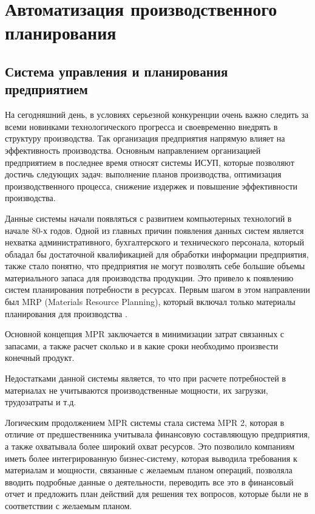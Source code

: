 \chapter{Автоматизация производственного планирования}
\section{Система управления и планирования предприятием}
На сегодняшний день, в условиях серьезной конкуренции очень важно следить за всеми новинками технологического прогресса и своевременно внедрять в структуру производства.
Так организация предприятия напрямую влияет на эффективность производства. Основным направлением организацией предприятием в последнее время относят системы ИСУП, которые позволяют достичь следующих задач: выполнение планов производства, оптимизация производственного процесса, снижение издержек и повышение эффективности производства.

Данные системы начали появляться с развитием компьютерных технологий в начале 80-х годов. Одной из главных причин появления данных систем является нехватка административного, бухгалтерского и технического персонала, который обладал бы достаточной квалификацией для обработки информации предприятия, также стало понятно, что предприятия не могут позволять себе большие объемы материального запаса для производства продукции. Это привело к появлению систем планирования потребности в ресурсах. Первым шагом в этом направлении был MRP (Materials Resource Planning), который включал только материалы планирования для производства \cite{MRP}.

Основной концепция MPR заключается в минимизации затрат связанных с запасами, а также расчет сколько и в какие сроки необходимо произвести конечный продукт. 

Недостатками данной системы является, то что при расчете потребностей в материалах не учитываются производственные мощности, их загрузки, трудозатраты и т.д. 

Логическим продолжением MPR системы стала система MPR 2, которая в отличие от предшественника учитывала финансовую составляющую предприятия, а также охватывала более широкий охват ресурсов. Это позволило компаниям иметь более интегрированную бизнес-систему, которая выводила требования к материалам и мощности, связанные с желаемым планом операций, позволяла вводить подробные данные о деятельности, переводить все это в финансовый отчет и предложить план действий для решения тех вопросов, которые были не в соответствии с желаемым планом.

